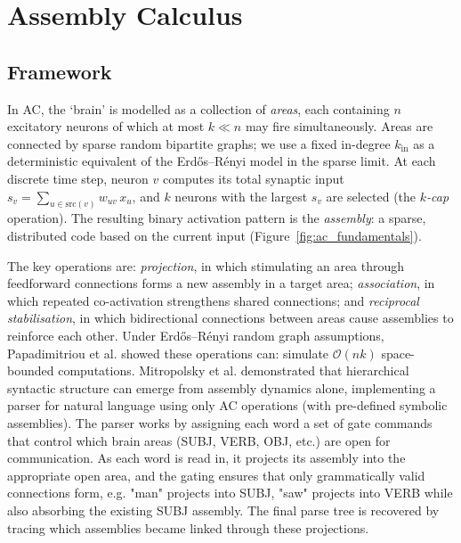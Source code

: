 \section{Assembly Calculus}

\subsection{Framework}

In AC, the `brain' is modelled as a collection of \textit{areas}, each containing $n$ excitatory neurons of which at most $k \ll n$ may fire simultaneously. Areas are connected by sparse random bipartite graphs; we use a fixed in-degree $k_\mathrm{in}$ as a deterministic equivalent of the Erd\H{o}s–R\'{e}nyi model in the sparse limit. At each discrete time step, neuron $v$ computes its total synaptic input $s_v = \sum_{u \in \mathrm{src}(v)} w_{uv}\, x_u$, and $k$ neurons with the largest $s_v$ are selected (the \textit{$k$-cap} operation). The resulting binary activation pattern is the \textit{assembly}: a sparse, distributed code based on the current input (Figure~\ref{fig:ac_fundamentals}).



The key operations are: \textit{projection}, in which stimulating an area through feedforward connections forms a new assembly in a target area; \textit{association}, in which repeated co-activation strengthens shared connections; and \textit{reciprocal stabilisation}, in which bidirectional connections between areas cause assemblies to reinforce each other. Under Erd\H{o}s--R\'{e}nyi random graph assumptions, Papadimitriou et al.\cite{papadimitriouBrainComputationAssemblies2020} showed these operations can: simulate $\mathcal{O}(nk)$ space-bounded computations. Mitropolsky et al.\cite{mitropolskyBiologicallyPlausibleParser2021}
demonstrated that hierarchical syntactic structure can emerge from assembly dynamics alone, implementing a parser for natural language using only AC operations (with pre-defined symbolic assemblies). The parser works by assigning each word a set of gate commands that control which brain areas (SUBJ, VERB, OBJ, etc.) are open for communication. As each word is read in, it projects its assembly into the appropriate open area, and the gating ensures that only grammatically valid connections form, e.g. "man" projects into SUBJ, "saw" projects into VERB while also absorbing the existing SUBJ assembly. The final parse tree is recovered by tracing which assemblies became linked through these projections.

